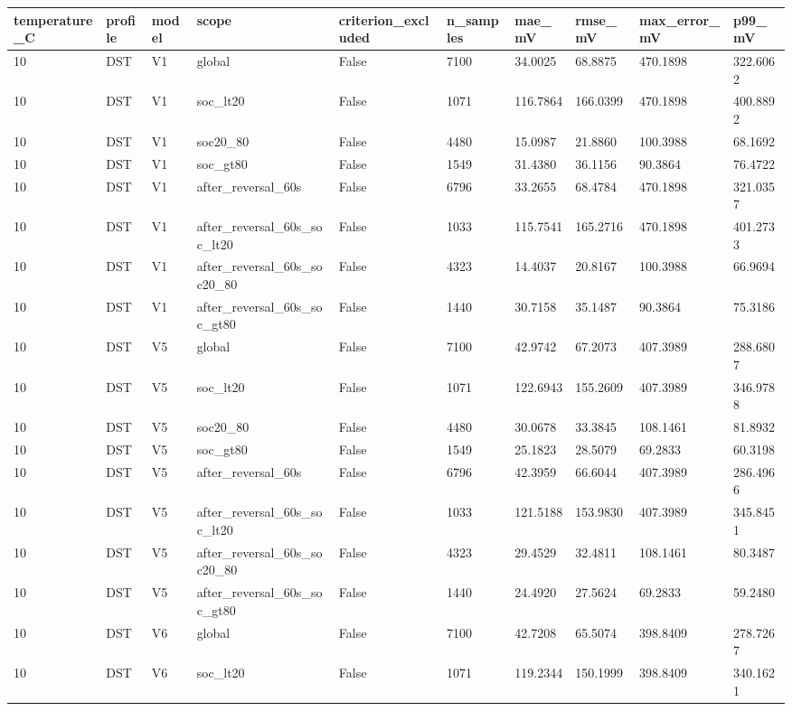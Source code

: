 \begin{tabular}{llllllllll}
\hline
temperature\_C & profile & model & scope & criterion\_excluded & n\_samples & mae\_mV & rmse\_mV & max\_error\_mV & p99\_mV \\
\hline
10 & DST & V1 & global & False & 7100 & 34.0025 & 68.8875 & 470.1898 & 322.6062 \\
10 & DST & V1 & soc\_lt20 & False & 1071 & 116.7864 & 166.0399 & 470.1898 & 400.8892 \\
10 & DST & V1 & soc20\_80 & False & 4480 & 15.0987 & 21.8860 & 100.3988 & 68.1692 \\
10 & DST & V1 & soc\_gt80 & False & 1549 & 31.4380 & 36.1156 & 90.3864 & 76.4722 \\
10 & DST & V1 & after\_reversal\_60s & False & 6796 & 33.2655 & 68.4784 & 470.1898 & 321.0357 \\
10 & DST & V1 & after\_reversal\_60s\_soc\_lt20 & False & 1033 & 115.7541 & 165.2716 & 470.1898 & 401.2733 \\
10 & DST & V1 & after\_reversal\_60s\_soc20\_80 & False & 4323 & 14.4037 & 20.8167 & 100.3988 & 66.9694 \\
10 & DST & V1 & after\_reversal\_60s\_soc\_gt80 & False & 1440 & 30.7158 & 35.1487 & 90.3864 & 75.3186 \\
10 & DST & V5 & global & False & 7100 & 42.9742 & 67.2073 & 407.3989 & 288.6807 \\
10 & DST & V5 & soc\_lt20 & False & 1071 & 122.6943 & 155.2609 & 407.3989 & 346.9788 \\
10 & DST & V5 & soc20\_80 & False & 4480 & 30.0678 & 33.3845 & 108.1461 & 81.8932 \\
10 & DST & V5 & soc\_gt80 & False & 1549 & 25.1823 & 28.5079 & 69.2833 & 60.3198 \\
10 & DST & V5 & after\_reversal\_60s & False & 6796 & 42.3959 & 66.6044 & 407.3989 & 286.4966 \\
10 & DST & V5 & after\_reversal\_60s\_soc\_lt20 & False & 1033 & 121.5188 & 153.9830 & 407.3989 & 345.8451 \\
10 & DST & V5 & after\_reversal\_60s\_soc20\_80 & False & 4323 & 29.4529 & 32.4811 & 108.1461 & 80.3487 \\
10 & DST & V5 & after\_reversal\_60s\_soc\_gt80 & False & 1440 & 24.4920 & 27.5624 & 69.2833 & 59.2480 \\
10 & DST & V6 & global & False & 7100 & 42.7208 & 65.5074 & 398.8409 & 278.7267 \\
10 & DST & V6 & soc\_lt20 & False & 1071 & 119.2344 & 150.1999 & 398.8409 & 340.1621 \\

\end{tabular}
